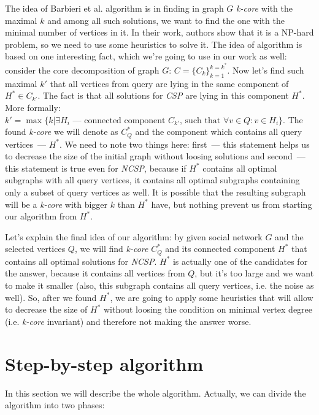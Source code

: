 The idea of Barbieri et al. algorithm \cite{Barbieri15} is in finding in graph $G$ \textit{k-core} with the maximal $k$ and among all such solutions, we want to find the one with the minimal number of vertices in it. In their work, authors show that it is a NP-hard problem, so we need to use some heuristics to solve it. The idea of algorithm is based on one interesting fact, which we're going to use in our work as well: consider the core decomposition of graph $G$: $C = \{C_k\}_{k=1}^{k=k^*}$. Now let's find such maximal $k'$ that all vertices from query are lying in the same component of $H^* \in C_{k'}$. The fact is that all solutions for \textit{CSP} are lying in this component $H^*$. More formally: $k' = \max\{k | \exists H_i\mbox{~--- connected component } C_{k'}\mbox{, such that } \forall v \in Q: v \in H_i\}$. The found \textit{k-core} we will denote as $C_Q^*$ and the component which contains all query vertices~--- $H^*$. We need to note two things here: first~--- this statement helps us to decrease the size of the initial graph without loosing solutions and second~--- this statement is true even for \textit{NCSP}, because if $H^*$ contains all optimal subgraphs with all query vertices, it contains all optimal subgraphs containing only a subset of query vertices as well. It is possible that the resulting subgraph will be a \textit{k-core} with bigger $k$ than $H^*$ have, but nothing prevent us from starting our algorithm from $H^*$.

Let's explain the final idea of our algorithm: by given social network $G$ and the selected vertices $Q$, we will find \textit{k-core} $C_Q^*$ and its connected component $H^*$ that contains all optimal solutions for \textit{NCSP}. $H^*$ is actually one of the candidates for the answer, because it contains all vertices from $Q$, but it's too large and we want to make it smaller (also, this subgraph contains all query vertices, i.e. the noise as well). So, after we found $H^*$, we are going to apply some heuristics that will allow to decrease the size of $H^*$ without loosing the condition on minimal vertex degree (i.e. \textit{k-core} invariant) and therefore not making the answer worse.

\section{Step-by-step algorithm}

In this section we will describe the whole algorithm. Actually, we can divide the algorithm into two phases:

